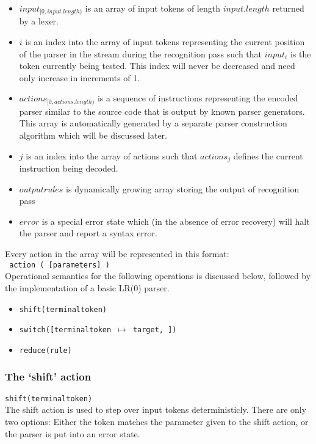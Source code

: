 \documentclass[11pt]{article}
\begin{document}
\begin{itemize}
\item $input_{[0, input.length)}$ is an array of input tokens of length $input.length$ returned by a lexer.
\item $i$ is an index into the array of input tokens representing the current position of the parser in the stream during the recognition pass such that $input_i$ is the token currently being tested.
This index will never be decreased and need only increase in increments of 1.
\item $actions_{[0, actions.length)}$ is a sequence of instructions representing the encoded parser similar to the source code that is output by known parser generators. 
This array is automatically generated by a separate parser construction algorithm which will be discussed later.
\item $j$ is an index into the array of actions such that $actions_j$ defines the current instruction being decoded.
\item $outputrules$ is dynamically growing array storing the output of recognition pass
\item $error$ is a special error state which (in the absence of error recovery) will halt the parser and report a syntax error.
\end{itemize}

Every action in the array will be represented in this format:\\
\texttt{ action ( [parameters\textellipsis] )}\\

Operational semantics for the following operations is discussed below, followed by the implementation of a basic LR(0) parser.
\begin{itemize}
\item \texttt{shift(terminaltoken)}
\item \texttt{switch([terminaltoken $\mapsto$ target, \textellipsis])}
\item \texttt{reduce(rule)}
\end{itemize}

\subsubsection{The `shift' action}
\texttt{shift(terminaltoken)}\\
The shift action is used to step over input tokens deterministicly. 
There are only two options: Either the token matches the parameter given to the shift action, or the parser is put into an error state.
\end{document}
